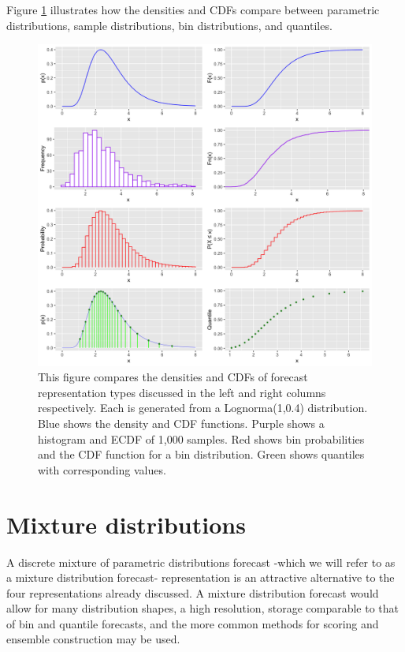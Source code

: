\documentclass[11pt,notitlepage]{isuthesis}
\begin{document}
Figure \ref{fig:denscomp} illustrates how the densities and CDFs compare 
between parametric distributions, sample distributions, bin distributions, and
quantiles. 

\begin{figure}[htbp]
\begin{center}

\captionsetup{font=scriptsize}
\centerline{\includegraphics[scale=.1]{Images/dens_cum_comp.png}}
\begin{minipage}{10cm}
\caption[Density/CDF comparison between parametric distribution, sample 
distribution, discretized bin distribution and quantiles]{This figure compares 
the
densities and CDFs of forecast representation types discussed in the left and 
right columns respectively. Each is generated from a Lognorma(1,0.4) 
distribution. Blue shows the density and CDF functions. Purple shows a 
histogram and ECDF of 1,000 samples. Red shows bin probabilities and the CDF
function for a bin distribution. Green shows quantiles
with corresponding values.}
\label{fig:denscomp}
\end{minipage}
\end{center}
\end{figure}


\newpage

\section{Mixture distributions}
A discrete mixture of parametric distributions forecast -which we will refer to
as a mixture distribution forecast- representation is an
attractive alternative to the four representations already discussed. 
A mixture distribution forecast
would allow for many distribution shapes, a high resolution, storage comparable
to that of bin and quantile forecasts, and the more common methods for scoring
and ensemble construction may be used.
\end{document}
